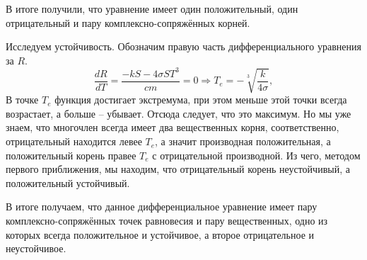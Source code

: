     В итоге получили, что уравнение имеет один положительный, один отрицательный и пару комплексно-сопряжённых корней.

    Исследуем устойчивость. Обозначим правую часть дифференциального уравнения за $ R $.
    \[
        \frac{dR}{dT} = \frac{-kS - 4\sigma S T^3}{cm} = 0 \Rightarrow T_e = -\sqrt[3]{\frac{k}{4 \sigma}},
    \]
    В точке $ T_e $ функция достигает экстремума, при этом меньше этой точки всегда возрастает, а больше -- убывает. Отсюда следует, что это максимум. Но мы уже знаем, что многочлен всегда имеет два вещественных корня, соответственно, отрицательный находится левее $ T_e $, а значит производная положительная, а положительный корень правее $ T_e $ с отрицательной производной. Из чего, методом первого приближения, мы находим, что отрицательный корень неустойчивый, а положительный устойчивый. 

    В итоге получаем, что данное дифференциальное уравнение имеет пару комплексно-сопряжённых точек равновесия и пару вещественных, одно из которых всегда положительное и устойчивое, а второе отрицательное и неустойчивое.